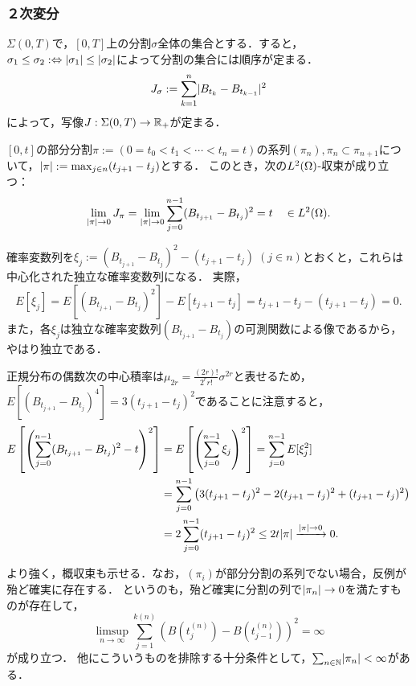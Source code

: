 \documentclass[uplatex,dvipdfmx]{jsreport}
\begin{document}
\subsubsection{２次変分}

\begin{notation}
    $\Sigma(0,T)$で，$[0,T]$上の分割$\sigma$全体の集合とする．すると，$\sigma_1\le\sigma_2:\Leftrightarrow\lvert\sigma_1\rvert\le\lvert\sigma_2\rvert$によって分割の集合には順序が定まる．
    \[J_\sigma:=\sum_{k=1}^n\lvert B_{t_k}-B_{t_{k-1}}\rvert^2\]
    によって，写像$J:\Sigma(0,T)\to\mathbb{R}_+$が定まる．
\end{notation}

\begin{proposition}[2次変動の$L^2$-収束]
    $[0,t]$の部分分割$\pi:=(0=t_0<t_1<\cdots<t_n=t)$の系列$(\pi_n),\pi_n\subset\pi_{n+1}$について，$\lvert\pi\rvert:=\max_{j\in n}(t_{j+1}-t_j)$とする．
    このとき，次の$L^2(\Omega)$-収束が成り立つ：
    \[\lim_{\lvert\pi\rvert\to0}J_\pi=\lim_{\lvert\pi\rvert\to0}\sum^{n-1}_{j=0}(B_{t_{j+1}}-B_{t_j})^2=t\quad\in L^2(\Omega).\]
\end{proposition}
\begin{Proof}
    確率変数列を$\xi_j:=(B_{t_{j+1}}-B_{t_j})^2-(t_{j+1}-t_j)\;(j\in n)$とおくと，これらは中心化された独立な確率変数列になる．
    実際，
    \[E[\xi_j]=E[(B_{t_{j+1}}-B_{t_j})^2]-E[t_{j+1}-t_j]=t_{j+1}-t_j-(t_{j+1}-t_j)=0.\]
    また，各$\xi_j$は独立な確率変数列$(B_{t_{j+1}}-B_{t_j})$の可測関数による像であるから，やはり独立である．
    
    正規分布の偶数次の中心積率は$\mu_{2r}=\frac{(2r)!}{2^rr!}\sigma^{2r}$と表せるため，$E[(B_{t_{j+1}}-B_{t_j})^4]=3(t_{j+1}-t_j)^2$であることに注意すると，
    \begin{align*}
        E\left[\left(\sum^{n-1}_{j=0}(B_{t_{j+1}}-B_{t_j})^2-t\right)^2\right]&=E\left[\left(\sum^{n-1}_{j=0}\xi_j\right)^2\right]=\sum^{n-1}_{j=0}E[\xi^2_j]\\
        &=\sum^{n-1}_{j=0}\left(3(t_{j+1}-t_j)^2-2(t_{j+1}-t_j)^2+(t_{j+1}-t_j)^2\right)\\
        &=2\sum^{n-1}_{j=0}(t_{j+1}-t_j)^2\le 2t\lvert\pi\rvert\xrightarrow{\lvert\pi\rvert\to0}0.
    \end{align*}
\end{Proof}
\begin{remark}
    より強く，概収束も示せる．なお，$(\pi_i)$が部分分割の系列でない場合，反例が殆ど確実に存在する．
    というのも，殆ど確実に分割の列で$\lvert\pi_n\rvert\to 0$を満たすものが存在して，
    \[\limsup_{n\to\infty}\sum^{k(n)}_{j=1}(B(t_j^{(n)})-B(t^{(n)}_{j-1}))^2=\infty\]
    が成り立つ．
    他にこういうものを排除する十分条件として，$\sum_{n\in\mathbb{N}}\lvert\pi_n\rvert<\infty$がある．
\end{remark}
\end{document}
